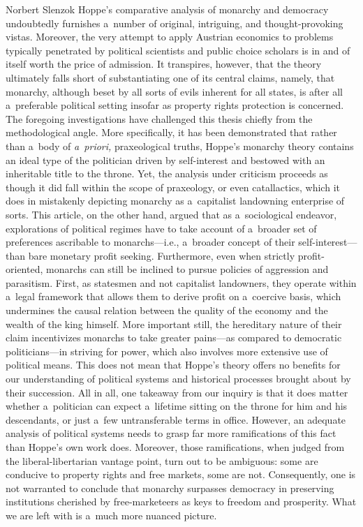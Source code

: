 \begin{artengenv}{Norbert Slenzok}
Hoppe's comparative analysis of monarchy and democracy undoubtedly furnishes a~number of original, intriguing, and thought-provoking vistas. Moreover, the very attempt to apply Austrian economics to problems typically penetrated by political scientists and public choice scholars is in and of itself worth the price of admission. It transpires, however, that the theory ultimately falls short of substantiating one of its central claims, namely, that monarchy, although beset by all sorts of evils inherent for all states, is after all a~preferable political setting insofar as property rights protection is concerned. The foregoing investigations have challenged this thesis chiefly from the methodological angle. More specifically, it has been demonstrated that rather than a~body of \textit{a~priori,} praxeological truths, Hoppe's monarchy theory contains an ideal type of the politician driven by self-interest and bestowed with an inheritable title to the throne. Yet, the analysis under criticism proceeds as though it did fall within the scope of praxeology, or even catallactics, which it does in mistakenly depicting monarchy as a~capitalist landowning enterprise of sorts. This article, on the other hand, argued that as a~sociological endeavor, explorations of political regimes have to take account of a~broader set of preferences ascribable to monarchs---i.e., a~broader concept of their self-interest---than bare monetary profit seeking. Furthermore, even when strictly profit-oriented, monarchs can still be inclined to pursue policies of aggression and parasitism. First, as statesmen and not capitalist landowners, they operate within a~legal framework that allows them to derive profit on a~coercive basis, which undermines the causal relation between the quality of the economy and the wealth of the king himself. More important still, the hereditary nature of their claim incentivizes monarchs to take greater pains---as compared to democratic politicians---in striving for power, which also involves more extensive use of political means. This does not mean that Hoppe's theory offers no benefits for our understanding of political systems and historical processes brought about by their succession. All in all, one takeaway from our inquiry is that it does matter whether a~politician can expect a~lifetime sitting on the throne for him and his descendants, or just a~few untransferable terms in office. However, an adequate analysis of political systems needs to grasp far more ramifications of this fact than Hoppe's own work does. Moreover, those ramifications, when judged from the liberal-libertarian vantage point, turn out to be ambiguous: some are conducive to property rights and free markets, some are not. Consequently, one is not warranted to conclude that monarchy surpasses democracy in preserving institutions cherished by free-marketeers as keys to freedom and prosperity. What we are left with is a~much more nuanced picture.
\enlargethispage{1.5\baselineskip}








\end{artengenv}

\label{slenzok-last}